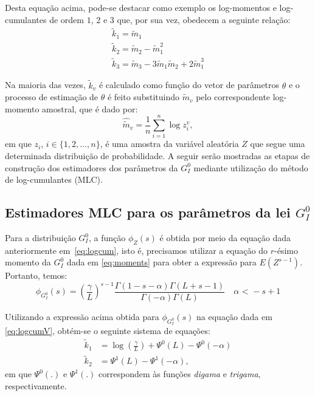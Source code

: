 Desta equação acima, pode-se destacar como exemplo os log-momentos e log-cumulantes de ordem $1$, $2$ e $3$ que, por sua vez, obedecem a seguinte relação:
\begin{equation}
    \begin{matrix}
        \widetilde{k}_{1} = \widetilde{m}_{1} \\ 
        \widetilde{k}_{2} = \widetilde{m}_{2} - \widetilde{m}_{1}^{2} \\
        \widetilde{k}_{3} = \widetilde{m}_{3} - 3\widetilde{m}_{1}\widetilde{m}_{2} + 2\widetilde{m}_{1}^{3} 
    \end{matrix}
    \label{eq:logcum123}
\end{equation}

Na maioria das vezes, $\widetilde{k}_{v}$ é calculado como função do vetor de parâmetros $\theta$ e o processo de estimação de $\theta$ é feito substituindo $\widetilde{m}_{v}$ pelo correspondente log-momento amostral, que é dado por:
\begin{equation}
    \widehat{\widetilde{m}}_{v} = \frac{1}{n}\sum_{i=1}^{n}\log z_{i}^{v},
    \label{eq:log_momAmostrais}
\end{equation}
em que $z_i$, $i \in \{1, 2, \dots, n\}$, é uma amostra da variável aleatória $Z$ que segue uma determinada distribuição de probabilidade. A seguir serão mostradas as etapas de construção dos estimadores dos parâmetros da $G_I^0$ mediante utilização do método de log-cumulantes (MLC). 

\subsection{Estimadores MLC para os parâmetros da lei $G_I^0$}

Para a distribuição $G_I^0$, a função $\phi_{Z}(s)$ é obtida por meio da equação dada anteriormente em~\eqref{eq:logcum}, isto é, precisamos utilizar a equação do $r$-ésimo momento da $G_I^0$ dada em \eqref{eq:moments} para obter a expressão para $E(Z^{s-1})$. Portanto, temos:
\begin{equation}
    \phi_{G_I^0}(s) = \left ( \frac{\gamma}{L} \right )^{s-1}\frac{\Gamma(1-s-\alpha)\Gamma(L+s-1)}{\Gamma(-\alpha)\Gamma(L)}  \quad \alpha \text{ < } -s+1
\end{equation}

Utilizando a expressão acima obtida para $\phi_{G_I^0}(s)$ na equação dada em \eqref{eq:logcumV}, obtém-se o seguinte sistema de equações:
\begin{align}
        \widetilde{k}_{1} &= \log \left ( \frac{\gamma}{L} \right ) + \Psi^{0}(L) - \Psi^{0}(-\alpha)  \\ 
        \widetilde{k}_{2} &= \Psi^{1}(L) - \Psi^{1}(-\alpha),
\end{align}
em que $\Psi^{0}(.)$ e $\Psi^{1}(.)$ correspondem às funções \textit{digama} e \textit{trigama}, respectivamente.

